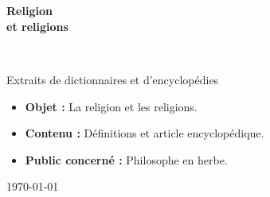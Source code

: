 \begin{titlepage}
%
~\\[1cm]

\begin{center}
\end{center}

\textsc{\Large }\\[0.5cm]

\HRule

\begin{center}
{\huge \bfseries  Religion\\
et religions\\[0.4cm] }
\end{center}

\HRule \\[1.5cm]


\vfill

\hfill
\begin{minipage}{0.4\textwidth}
\begin{flushright} \large
Extraits de dictionnaires et d'encyclopédies
\end{flushright}
\end{minipage}

\vfill
{\sf \footnotesize
\begin{itemize}[leftmargin=1cm, label=, itemsep=1pt]
\item {\bf Objet : } La religion et les religions.
\item {\bf Contenu : } Définitions et article encyclopédique.
\item {\bf Public concerné : } Philosophe en herbe.
\end{itemize}
}

\vfill

{\large \today}

\end{titlepage}
